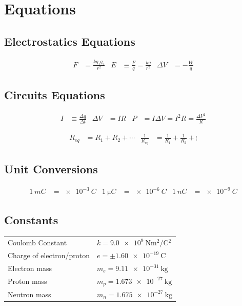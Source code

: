\section*{Equations}

\subsection*{Electrostatics Equations}

\begin{align*}
  F &= \frac{kq_1 q_2} {r^2} &
  E &\equiv \frac{F}{q} = \frac{kq}{r^2} &
  \Delta V &= -\frac{W}{q}
\end{align*}

\subsection*{Circuits Equations}

\begin{align*}
  I &\equiv \frac{\Delta q}{\Delta t} &
  \Delta V &= IR &
  P &= I\Delta V = I^2 R = \frac{\Delta V^2}{R}
\end{align*}


\begin{align*}
  R_{eq} &= R_1 + R_2 + \cdots &
  \frac{1}{R_{eq}} &= \frac{1}{R_1} + \frac{1}{R_2} + \vdots
\end{align*}

\subsection*{Unit Conversions}

\begin{align*}
  \SI{1}{mC} &= \SI{e-3}{C} &
  \SI{1}{\micro C} &= \SI{e-6}{C} &
  \SI{1}{n C} &= \SI{e-9}{C}
\end{align*}


\subsection*{Constants}

\vspace{2em}

\begin{tabular}{ll}
Coulomb Constant          &   $k = \SI{9.0e9}{\newton\meter^2\per\coulomb^2}$\\
Charge of electron/proton &   $e=\pm\SI{1.60e-19}{\coulomb}$\\
Electron mass             &   $m_e=\SI{9.11e-31}{\kilo\gram}$\\
Proton mass	              &   $m_p=\SI{1.673e-27}{\kilo\gram}$\\
Neutron mass	            &   $m_n=\SI{1.675e-27}{\kilo\gram}$
\end{tabular}
